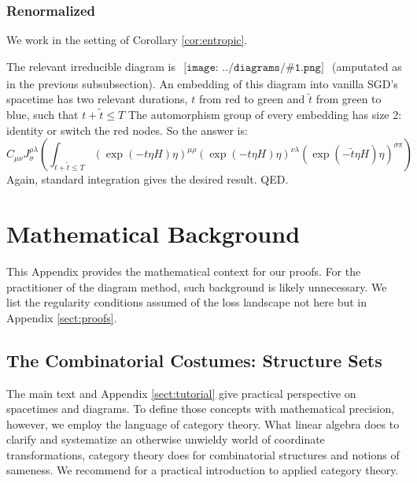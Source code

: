 \documentclass{article}
\theoremstyle{plain}
\theoremstyle{definition}
\newcommand{\wrap}[1]{\left(#1\right)}
\newcommand{\sdia}[1]{\begin{gathered}\texttt{[image: ../diagrams/\#1.png]}\end{gathered}}
\begin{document}
        \subsubsection*{Renormalized}
            We work in the setting of Corollary \ref{cor:entropic}.

            The relevant irreducible diagram is $\sdia{c(01-2-3)(02-12-23)}$
            (amputated as in the previous subsubsection).   
            An embedding of this diagram into vanilla SGD's spacetime
            has two relevant durations, 
            $t$ from {\color{moor}red} to {\color{moog}green} and
            $\tilde t$ from {\color{moog}green} to {\color{moob}blue},
            such that $t+\tilde t \leq T$
            The automorphism group of every embedding has size $2$: identity
            or switch the {\color{moor}red} nodes.  So the answer is: 
            $$
                C_{\mu \nu}
                J^{\rho\lambda}_{\sigma}
                \wrap{\int_{t+\tilde t\leq T}
                    \wrap{\exp(-t \eta H) \eta}^{\mu\rho}
                    \wrap{\exp(-t \eta H) \eta}^{\nu\lambda}
                    \wrap{\exp(-\tilde t \eta H) \eta}^{\sigma\pi}
                }
            $$
            Again, standard integration gives the desired result.
            QED.

\section{Mathematical Background} \label{sect:morebackground}
    This Appendix provides the mathematical context for our proofs.  For the
    practitioner of the diagram method, such background is likely unnecessary.
    We list the regularity conditions assumed of the loss landscape not here
    but in Appendix \ref{sect:proofs}.

    \subsection{The Combinatorial Costumes: Structure Sets}
        The main text and Appendix \ref{sect:tutorial} give practical
        perspective on spacetimes and diagrams.  To define those concepts with
        mathematical precision, however, we employ the language of category
        theory.  What linear algebra does to clarify and systematize an
        otherwise unwieldy world of coordinate transformations, category theory
        does for combinatorial structures and notions of sameness.  We
        recommend \citet{fo19} for a practical introduction to applied category
        theory.
\end{document}
